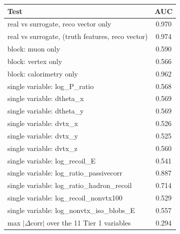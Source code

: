 \begin{tabular}{lc}
\toprule
Test & AUC \\
\midrule
real vs surrogate, reco vector only & 0.970 \\
real vs surrogate, (truth features, reco vector) & 0.974 \\
\midrule
block: muon only & 0.590 \\
block: vertex only & 0.566 \\
block: calorimetry only & 0.962 \\
single variable: log\_P\_ratio & 0.568 \\
single variable: dtheta\_x & 0.569 \\
single variable: dtheta\_y & 0.569 \\
single variable: dvtx\_x & 0.526 \\
single variable: dvtx\_y & 0.525 \\
single variable: dvtx\_z & 0.560 \\
single variable: log\_recoil\_E & 0.541 \\
single variable: log\_ratio\_passivecorr & 0.887 \\
single variable: log\_ratio\_hadron\_recoil & 0.714 \\
single variable: log\_recoil\_nonvtx100 & 0.529 \\
single variable: log\_nonvtx\_iso\_blobs\_E & 0.557 \\
\midrule
max $|\Delta$corr$|$ over the 11 Tier 1 variables & 0.294 \\
\bottomrule
\end{tabular}
